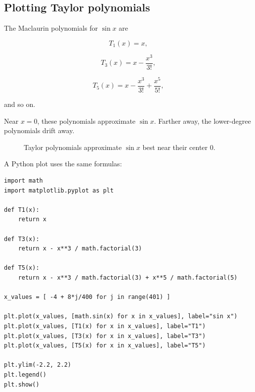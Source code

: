 \subsection{Plotting Taylor polynomials}
\label{appsubsec:plotting-taylor-polynomials}

The Maclaurin polynomials for \(\sin x\) are

\[
T_1(x)=x,
\]

\[
T_3(x)=x-\frac{x^3}{3!},
\]

\[
T_5(x)=x-\frac{x^3}{3!}+\frac{x^5}{5!},
\]

and so on.

Near \(x=0\), these polynomials approximate \(\sin x\).  Farther away, the lower-degree
polynomials drift away.

\begin{figure}[h]
\centering
{}
\caption{Taylor polynomials approximate \(\sin x\) best near their center \(0\).}
\label{fig:technology-taylor-polynomials-sine}
\end{figure}

A Python plot uses the same formulas:

\begin{verbatim}
import math
import matplotlib.pyplot as plt

def T1(x):
    return x

def T3(x):
    return x - x**3 / math.factorial(3)

def T5(x):
    return x - x**3 / math.factorial(3) + x**5 / math.factorial(5)

x_values = [ -4 + 8*j/400 for j in range(401) ]

plt.plot(x_values, [math.sin(x) for x in x_values], label="sin x")
plt.plot(x_values, [T1(x) for x in x_values], label="T1")
plt.plot(x_values, [T3(x) for x in x_values], label="T3")
plt.plot(x_values, [T5(x) for x in x_values], label="T5")

plt.ylim(-2.2, 2.2)
plt.legend()
plt.show()
\end{verbatim}

